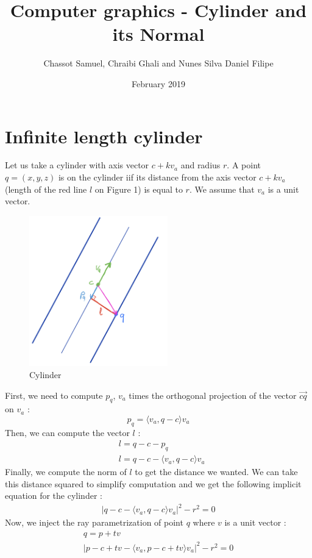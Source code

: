 \documentclass{article}
\title{Computer graphics - Cylinder and its Normal}
\author{Chassot Samuel, Chraibi Ghali and Nunes Silva Daniel Filipe}
\date{February 2019}
\begin{document}
\maketitle

\section{Infinite length cylinder}
Let us take a cylinder with axis vector $c + \textit{k} v_a$ and radius $\textit{r}$. A point $q = (x,y,z)$ is on the cylinder iif its distance from the axis vector $c + \textit{k} v_a$ (length of the red line $l$ on Figure 1) is equal to $\textit{r}$. We assume that $v_a$ is a unit vector.

\begin{figure}[h]
\centering
\includegraphics[width=6cm]{res/Cylinder_sketch.jpeg}
\caption{Cylinder}
\end{figure}

First, we need to compute $p_q$, $v_a$ times the orthogonal projection of the vector $\overrightarrow{cq}$ on $v_a$ :
$$p_q = \langle v_a, q-c\rangle  v_a$$
Then, we can compute the vector $l$ :
\begin{align*}
    &l = q-c-p_q \\
    &l = q-c - \langle v_a, q-c\rangle  v_a
\end{align*}
Finally, we compute the norm of $l$ to get the distance we wanted. We can take this distance squared to simplify computation and we get the following implicit equation for the cylinder :
\begin{gather*}
    |q-c-\langle v_a, q-c\rangle  v_a|^2 - r^2 = 0
\end{gather*}
Now, we inject the ray parametrization of point $q$ where $v$ is a unit vector :
\begin{gather*}
    q=p+tv \\
    |p-c+tv-\langle v_a, p-c+tv\rangle v_a|^2-r^2=0
\end{gather*}
\end{document}
